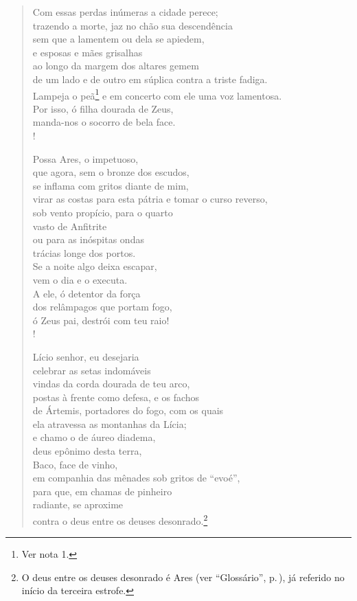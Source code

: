 \begin{verse}
Com essas perdas inúmeras a cidade perece;\\ %
trazendo a morte, jaz no chão sua descendência \\
sem que a lamentem ou dela se apiedem,\\
e esposas e mães grisalhas\\
ao longo da margem dos altares gemem\\
de um lado e de outro em súplica contra a triste fadiga.\\
Lampeja o peã\footnote{Ver nota 1.} %
e em concerto com ele uma voz lamentosa.\\
Por isso, ó filha dourada de Zeus,\\
manda-nos o socorro de bela face.\\!

Possa Ares, o impetuoso, \\ %
que agora, sem o bronze dos escudos,\\
se inflama com gritos diante de mim,\\
virar as costas para esta pátria e tomar o curso reverso,\\
sob vento propício, para o quarto\\
vasto de Anfitrite\\
ou para as inóspitas ondas\\
trácias longe dos portos.\\
Se a noite algo deixa escapar,\\
vem o dia e o executa.\\
A ele, ó detentor da força \\
dos relâmpagos que portam fogo,\\
ó Zeus pai, destrói com teu raio!\\!

Lício senhor, eu desejaria\\ %
celebrar as setas indomáveis\\
vindas da corda dourada de teu arco,\\
postas à frente como defesa, e os fachos\\
de Ártemis, portadores do fogo, com os quais\\
ela atravessa as montanhas da Lícia;\\
e chamo o de áureo diadema,\\
deus epônimo desta terra, \\
Baco, face de vinho,\\
em companhia das mênades sob gritos de ``evoé'',\\
para que, em chamas de pinheiro\\
radiante, se aproxime\\
contra o deus entre os deuses desonrado.\footnote{O deus entre os deuses desonrado é Ares (ver ``Glossário'', p.\,\pageref{glossario}), já referido no início da terceira estrofe.}
\end{verse}


